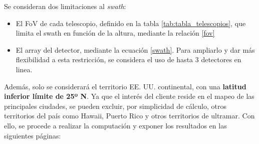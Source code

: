 Se consideran dos limitaciones al \textit{swath}:
\begin{itemize}
    \item El FoV de cada telescopio, definido en la tabla \ref{tab:tabla_telescopios}, que limita el swath en función de la altura, mediante la relación \ref{fov}
    \item El array del detector, mediante la ecuación \ref{swath}. Para ampliarlo y dar más flexibilidad a esta restricción, se considera el uso de hasta 3 detectores en linea.
\end{itemize}

Además, solo se considerará el territorio EE. UU. continental, con una \textbf{latitud inferior límite de 25º N}. Ya que el interés del cliente reside en el mapeo de las principales ciudades, se pueden excluir, por simplicidad de cálculo, otros territorios del país como Hawaii, Puerto Rico y otros territorios de ultramar. Con ello, se procede a realizar la computación y exponer los resultados en las siguientes páginas:

